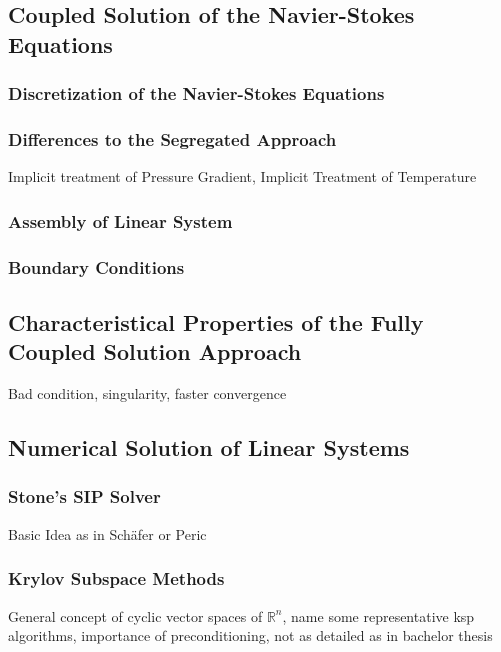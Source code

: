 \documentclass[article,type=msc,colorback,accentcolor=tud2a]{tudthesis}
\begin{document}
    \subsection{Coupled Solution of the Navier-Stokes Equations}

      \subsubsection{Discretization of the Navier-Stokes Equations}
      \subsubsection{Differences to the Segregated Approach}

        Implicit treatment of Pressure Gradient, Implicit Treatment of Temperature

      \subsubsection{Assembly of Linear System}

      \subsubsection{Boundary Conditions}

      \subsection{Characteristical Properties of the Fully Coupled Solution Approach}

      Bad condition, singularity, faster convergence

      \subsection{Numerical Solution of Linear Systems}

        \subsubsection{Stone's SIP Solver}
        Basic Idea as in Schäfer or Peric
        \subsubsection{Krylov Subspace Methods}
        General concept of cyclic vector spaces of \(\mathbb{R}^n\), name some representative ksp algorithms, importance of preconditioning, not as detailed as in bachelor thesis
\end{document}
